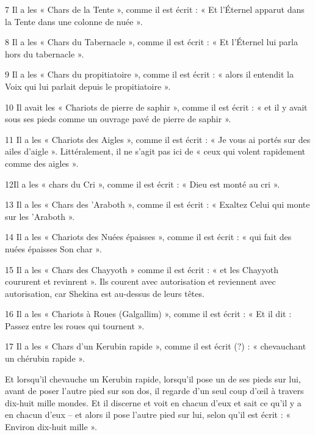 \par 7 Il a les « Chars de la Tente », comme il est écrit : « Et l'Éternel apparut dans la Tente dans une colonne de nuée ».

\par 8 Il a les « Chars du Tabernacle », comme il est écrit : « Et l'Éternel lui parla hors du tabernacle ».

\par 9 Il a les « Chars du propitiatoire », comme il est écrit : « alors il entendit la Voix qui lui parlait depuis le propitiatoire ».

\par 10 Il avait les « Chariots de pierre de saphir », comme il est écrit : « et il y avait sous ses pieds comme un ouvrage pavé de pierre de saphir ».

\par 11 Il a les « Chariots des Aigles », comme il est écrit : « Je vous ai portés sur des ailes d'aigle ». Littéralement, il ne s’agit pas ici de « ceux qui volent rapidement comme des aigles ».

\par 12Il a les « chars du Cri », comme il est écrit : « Dieu est monté au cri ».

\par 13 Il a les « Chars des 'Araboth », comme il est écrit : « Exaltez Celui qui monte sur les 'Araboth ».

\par 14 Il a les « Chariots des Nuées épaisses », comme il est écrit : « qui fait des nuées épaisses Son char ».

\par 15 Il a les « Chars des Chayyoth » comme il est écrit : « et les Chayyoth coururent et revinrent ». Ils courent avec autorisation et reviennent avec autorisation, car Shekina est au-dessus de leurs têtes.

\par 16 Il a les « Chariots à Roues (Galgallim) », comme il est écrit : « Et il dit : Passez entre les roues qui tournent ».

\par 17 Il a les « Chars d'un Kerubin rapide », comme il est écrit (?) : « chevauchant un chérubin rapide ».

\par Et lorsqu'il chevauche un Kerubin rapide, lorsqu'il pose un de ses pieds sur lui, avant de poser l'autre pied sur son dos, il regarde d'un seul coup d'œil à travers dix-huit mille mondes. Et il discerne et voit en chacun d’eux et sait ce qu’il y a en chacun d’eux – et alors il pose l’autre pied sur lui, selon qu’il est écrit : « Environ dix-huit mille ».

